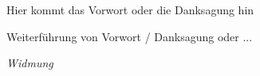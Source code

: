 

Hier kommt das Vorwort oder die Danksagung hin

\newpage
\thispagestyle{empty}

Weiterführung von Vorwort / Danksagung oder ...

\vspace*{100mm}
\begin{center}
\emph{Widmung}
\end{center}

\newpage
